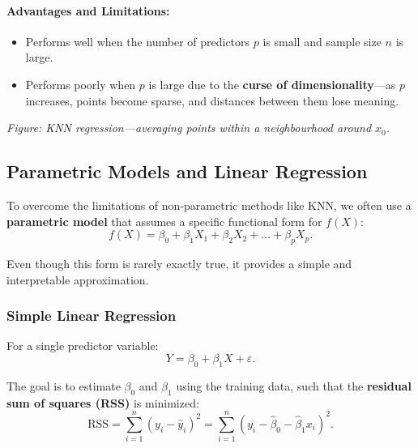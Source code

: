 \paragraph{Advantages and Limitations:}
\begin{itemize}
    \item Performs well when the number of predictors \(p\) is small and sample size \(n\) is large.
    \item Performs poorly when \(p\) is large due to the \textbf{curse of dimensionality}—as \(p\) increases, points become sparse, and distances between them lose meaning.
\end{itemize}

\begin{center}

\textit{Figure: KNN regression—averaging points within a neighbourhood around \(x_0\).}
\end{center}

\subsection{Parametric Models and Linear Regression}

To overcome the limitations of non-parametric methods like KNN, we often use a \textbf{parametric model} that assumes a specific functional form for \( f(X) \):
\[
f(X) = \beta_0 + \beta_1 X_1 + \beta_2 X_2 + \dots + \beta_p X_p.
\]

Even though this form is rarely exactly true, it provides a simple and interpretable approximation.

\subsubsection{Simple Linear Regression}

For a single predictor variable:
\[
Y = \beta_0 + \beta_1 X + \varepsilon.
\]

The goal is to estimate \( \beta_0 \) and \( \beta_1 \) using the training data, such that the \textbf{residual sum of squares (RSS)} is minimized:
\[
\text{RSS} = \sum_{i=1}^{n} (y_i - \hat{y}_i)^2 = \sum_{i=1}^{n} (y_i - \hat{\beta}_0 - \hat{\beta}_1 x_i)^2.
\]

